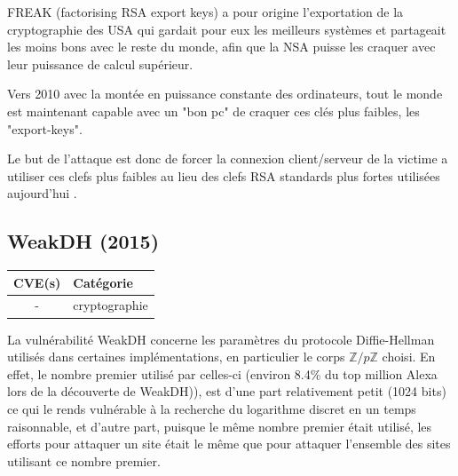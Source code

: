 \vspace{1em}

FREAK (factorising RSA export keys) a pour origine l'exportation de la cryptographie des USA qui gardait pour eux les meilleurs systèmes et partageait les moins bons avec le reste du monde, afin que la NSA puisse les craquer avec leur puissance de calcul supérieur.

Vers 2010 avec la montée en puissance constante des ordinateurs, tout le monde est maintenant capable avec un "bon pc" de craquer ces clés plus faibles, les "export-keys".

Le but de l'attaque est donc de forcer la connexion client/serveur de la victime a utiliser ces clefs plus faibles au lieu des clefs RSA standards plus fortes utilisées aujourd'hui \cite{freak}.




\subsection{WeakDH (2015)}

\begin{tabularx}{0.96\textwidth}{|c|X|}
  \hline
  \textbf{CVE(s)} & \textbf{Catégorie} \\
  \hline
  - & cryptographie \\
  \hline
\end{tabularx}

\vspace{1em}

La vulnérabilité WeakDH concerne les paramètres du protocole Diffie-Hellman utilisés dans certaines implémentations, en particulier le corps $\mathbb{Z}/p\mathbb{Z}$ choisi. En effet, le nombre premier utilisé par celles-ci (environ 8.4\% du top million Alexa lors de la découverte de WeakDH)), est d'une part relativement petit (1024 bits) ce qui le rends vulnérable à la recherche du logarithme discret en un temps raisonnable, et d'autre part, puisque le même nombre premier était utilisé, les efforts pour attaquer un site était le même que pour attaquer l'ensemble des sites utilisant ce nombre premier\cite{weakdh}.




